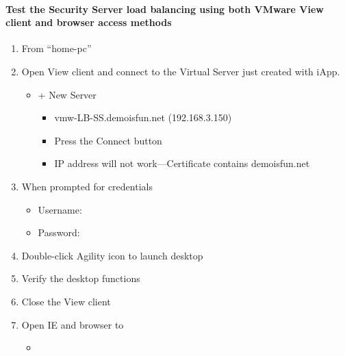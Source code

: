 \documentclass[letterpaper,10pt,english]{sphinxmanual}
\begin{document}
\paragraph{Test the Security Server load balancing using both VMware View client and browser access methods}
\label{\detokenize{class2/module1/lab1:test-the-security-server-load-balancing-using-both-vmware-view-client-and-browser-access-methods}}\begin{enumerate}
\item {} 
From “home-pc”

\item {} 
Open View client and connect to the Virtual Server just created with
iApp.
\begin{itemize}
\item {} 
+ New Server
\begin{itemize}
\item {} 
vmw-LB-SS.demoisfun.net (192.168.3.150)

\item {} 
Press the Connect button

\item {} 
IP address will not work—Certificate contains demoisfun.net

\end{itemize}

\end{itemize}

\item {} 
When prompted for credentials
\begin{itemize}
\item {} 
Username: 

\item {} 
Password: 

\end{itemize}

\item {} 
Double-click Agility icon to launch desktop

\item {} 
Verify the desktop functions

\item {} 
Close the View client

\item {} 
Open IE and browser to
\begin{itemize}
\item {} 

\end{itemize}


\end{enumerate}
\end{document}
